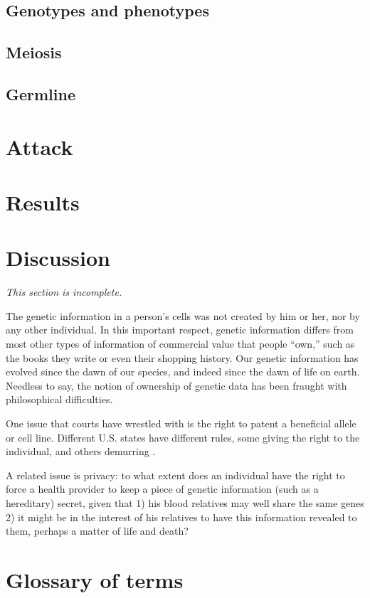 \documentclass{article}
\begin{document}

\subsection{Genotypes and phenotypes}
\label{genotypephenotype}

\subsection{Meiosis}

\subsection{Germline}

\section{Attack}
\label{attack}

\section{Results}
\label{results}

\section{Discussion}
\label{discussion}
{\em This section is incomplete.}

The genetic information in a person's cells was not created by him or her, nor by any other individual. In this important respect, genetic information differs from most other types of information of commercial value that people ``own,'' such as the books they write or even their shopping history. Our genetic information has evolved since the dawn of our species, and indeed since the dawn of life on earth. Needless to say, the notion of ownership of genetic data has been fraught with philosophical difficulties.

One issue that courts have wrestled with is the right to patent a beneficial allele or cell line. Different U.S. states have different rules, some giving the right to the individual, and others demurring \cite{john-moore-who-owns-your-genetic-information}.

A related issue is  privacy: to what extent does an individual have the right to force a health provider to keep a piece of genetic information (such as a hereditary) secret, given that 1) his blood relatives may well share the same genes 2) it might be in the interest of his relatives to have this information revealed to them, perhaps a matter of life and death?


\section{Glossary of terms}


\end{document}
